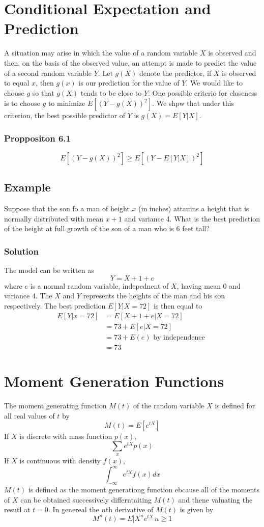 \section{Conditional Expectation and Prediction}
A situation may arise in which the value of a random variable $X$ is observed and then, on the basis of the observed value, an attempt is made to predict the value of a second random variable $Y$. Let $g(X)$ denote the predictor, if $X$ is observed to equal $x$, then $g(x)$ is our prediction for the value of $Y$. We would like to choose $g$ so that $g(X)$ tends to be close to $Y$. One possible criterio for closeness is to choose $g$ to minimize $E[(Y-g(X))^2]$. We shpw that under this criterion, the best possible predictor of $Y$ is $g(X) = E[Y|X]$. \\
\subsubsection{Proppositon 6.1}
\[E[(Y-g(X))^2]\geq E[(Y-E[Y|X])^2]\]
\subsection*{Example}
Suppose that the son fo a man of height $x$ (in inches) attauins a height that is normally distributed with mean $x + 1$ and variance 4. What is the best prediction of the height at full growth of the son of a man who is $6$ feet tall?
\subsubsection*{Solution}
The model can be written as \[Y = X + 1 + e\]
where $e$ is a normal random variable, indepednent of $X$, having mean $0$ and variance $4$. The $X$ and $Y$ represents the heights of the man and his son respectively. The best prediction $E[Y|X = 72]$ is then equal to 
\begin{equation*}
    \begin{split}
        E[Y|x = 72] &= E[X + 1 + e | X = 72]\\
        &= 73 + E[e|X = 72]\\
        &= 73 + E(e) \text{ by independence }\\
        &= 73
    \end{split}
\end{equation*}
\section{Moment Generation Functions}
The moment generating function $M(t)$ of the random variable $X$ is defined for all real values of $t$ by \[M(t) = E[e^{tX}]\]
If $X$ is discrete with mass function $p(x)$, \[\sum_x e^{tX} p(x)\] If $X$ is continuous with density $f(x)$, \[\int^\infty_{-\infty} e^{tX} f(x) dx\]
$M(t)$ is defined as the moment generationg function ebcause all of the moments of $X$ can be obtained successively differntaiting $M(t)$ and thene valuating the resutl at $t = 0$. In genereal the $n$th derivative of $M(t)$ is given by \[M^n(t) = E[X^ne^{tX}\, n\geq 1\]
